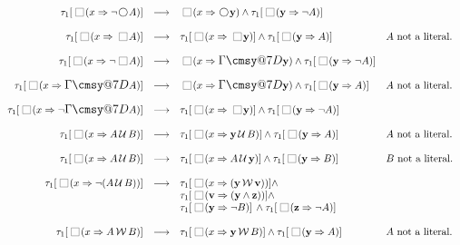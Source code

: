 \documentclass[nohyperref]{acmtrans2f}
\makeatletter
\def\sometime{\mathord{\hbox{\large$\mathchar"0\cmsy@7D$}}}
\newcommand{\always}{\raisebox{-.2ex}{
                           \mbox{\unitlength=0.9ex
                           \begin{picture}(2,2)
                           \linethickness{0.06ex}
                           \put(0,0){\line(1,0){2}}
                           \put(0,2){\line(1,0){2}}
                           \put(0,0){\line(0,1){2}}
                           \put(2,0){\line(0,1){2}}
                           \end{picture}}}
                          \,}
\newcommand{\next}{\!\raisebox{-.2ex}{ %
                        \mbox{\unitlength=0.9ex
                        \begin{picture}(2,2)
                        \linethickness{0.06ex}
                        \put(1,1){\circle{2}} %
                        \end{picture}}}       %
                        \,}
\def\until{\hbox{$\,\cal U \,$}}
\def\unless{\hbox{$\,\cal W \,$}}
\let\imp=\Rightarrow
\makeatother
\begin{document}
$$
\begin{array}{rcll}
\tau_1[\always(x \imp \neg \next A)]
 & \longrightarrow  &
\always(x  \imp  \next {\bf y}) \land
\tau_1[\always({\bf y}  \imp  \neg A)] \\
\\
\tau_1[\always(x \imp \always A)]
 & \longrightarrow  &
\tau_1[\always(x  \imp  \always {\bf y})] \land
\tau_1[\always({\bf y}  \imp  A)]
 &\mbox{$A$ not a literal.}\\
\\
\tau_1[\always(x \imp \neg \always A)]
 & \longrightarrow  &
\always(x  \imp  \sometime {\bf y}) \land
\tau_1[\always({\bf y}  \imp  \neg A)]\\
\\
\tau_1[\always(x \imp \sometime A )]
 & \longrightarrow  &
\always(x  \imp  \sometime {\bf y}) \land 
\tau_1[\always({\bf y}  \imp  A)]
 &\mbox{$A$ not a literal.}\\
\\
\tau_1[\always(x \imp \neg \sometime A)]
 & \longrightarrow  &
\tau_1[\always(x  \imp  \always {\bf y})] \land
\tau_1[\always({\bf y}  \imp  \neg A)]\\
\\
\tau_1[\always(x \imp  A \until B)]
 & \longrightarrow  &
\tau_1[\always(x  \imp  {\bf y} \until B)] \land
\tau_1[\always({\bf y}  \imp  A)]
 &\mbox{$A$ not a literal.}\\
\\
\tau_1[\always(x \imp  A \until B)]
 & \longrightarrow  &
\tau_1[\always(x  \imp  A \until {\bf y})] \land 
\tau_1[\always({\bf y}  \imp  B)]
 &\mbox{$B$ not a literal.}\\
\\
\tau_1[\always(x \imp \neg (A \until B))]
 & \longrightarrow  &
\tau_1[\always(x  \imp  ({\bf y} \unless {\bf v}))] \land \\
& &  \tau_1[\always({\bf v} \imp ({\bf y} \land {\bf z}))] \land \\
& & \tau_1[\always({\bf y} \imp \neg B)]\,\land 
\tau_1[\always({\bf z} \imp \neg A)]\\
\\
\tau_1[\always(x \imp  A \unless B)]
 & \longrightarrow  &
\tau_1[\always(x  \imp  {\bf y} \unless B)] \land
\tau_1[\always({\bf y}  \imp  A)]
 &\mbox{$A$ not a literal.}\\

\end{array}$$
\end{document}
